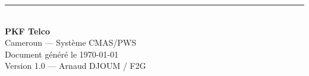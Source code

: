 \documentclass[11pt,a4paper]{article}
\begin{document}
\vfill

\begin{center}
{\color{pkforange}\rule{0.8\textwidth}{2pt}}\\[0.5cm]
{\Large\textbf{\textcolor{pkfblue}{PKF Telco}}}\\[0.3cm]
\textcolor{pkfgray}{Cameroun — Système CMAS/PWS}\\[0.3cm]
\textcolor{pkfgray}{Document généré le \today}\\[0.3cm]
\textcolor{pkfgray}{\small Version 1.0 — Arnaud DJOUM / F2G}
\end{center}
\end{document}
